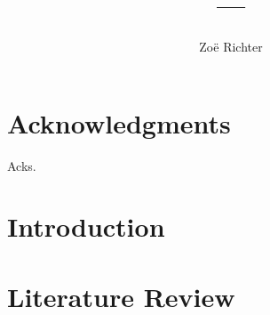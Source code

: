 \documentclass[edeposit,fullpage]{uiucthesis2018}
\title{---}
\author{Zo{\"e} Richter}
\begin{document}
\maketitle

\frontmatter
\begin{abstract}



\end{abstract}

\chapter*{Acknowledgments}

Acks.


\tableofcontents
\listoftables
\listoffigures


\pagebreak
\mainmatter

\chapter{Introduction}


\chapter{Literature Review}

\end{document}
